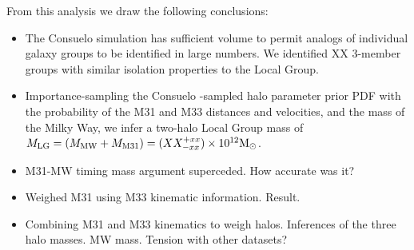 \documentclass{emulateapj}
\newcommand{\MMW}{{\rm M}_{\rm MW}}
\newcommand{\Msun}{{\rm M}_\odot}
\newcommand{\consuelo}{{\sc Consuelo }}
\def\MLG{M_{\rm LG}}
\def\MMW{M_{\rm MW}}
\def\MEI{M_{\rm M31}}
\def\MEE{M_{\rm M33}}
\def\MPAIRestimate{XX}
\def\MPAIRerrorplus{xx}
\def\MPAIRerrorminus{xx}
\def\MTRIPLETestimate{XX}
\def\MTRIPLETerrorplus{xx}
\def\MTRIPLETerrorminus{xxx}
\def\MEIestimate{XX}
\def\MEIerrorplus{xx}
\def\MEIerrorminus{xx}
\def\MEEestimate{XX}
\def\MEEerrorplus{xx}
\def\MEEerrorminus{xx}
\begin{document}
From this analysis we draw the following conclusions:
\begin{itemize}

\item The \consuelo simulation has sufficient volume to permit analogs of
individual galaxy groups to be identified in large numbers. We identified XX
3-member groups with similar isolation properties to the Local Group.

\item Importance-sampling the \consuelo-sampled halo parameter prior PDF with
the probability of the M31 and M33 distances and velocities, and the mass of
the Milky Way, we infer a two-halo Local Group mass of $\MLG = (\MMW + \MEI)
= (\MPAIRestimate^{+\MPAIRerrorplus}_{-\MPAIRerrorminus}) \times 10^{12}
\Msun$.

\item M31-MW timing mass argument superceded. How accurate was it? 

\item Weighed M31 using M33 kinematic information. Result.

\item Combining M31 and M33 kinematics to weigh halos. Inferences of the three
halo masses. MW mass. Tension with other datasets?

% 
% 

\end{itemize}





\end{document}
